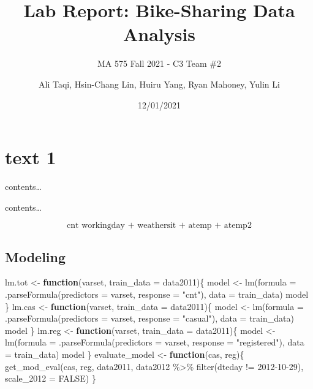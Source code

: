 \documentclass[
  twocolumn]{article}
\title{Lab Report: Bike-Sharing Data Analysis}
\subtitle{MA 575 Fall 2021 - C3 Team \#2}
\author{Ali Taqi, Hsin-Chang Lin, Huiru Yang, Ryan Mahoney, Yulin Li}
\date{12/01/2021}
\newenvironment{Shaded}{\begin{snugshade}}{\end{snugshade}}
\newcommand{\AttributeTok}[1]{\textcolor[rgb]{0.77,0.63,0.00}{#1}}
\newcommand{\ConstantTok}[1]{\textcolor[rgb]{0.00,0.00,0.00}{#1}}
\newcommand{\ControlFlowTok}[1]{\textcolor[rgb]{0.13,0.29,0.53}{\textbf{#1}}}
\newcommand{\FunctionTok}[1]{\textcolor[rgb]{0.00,0.00,0.00}{#1}}
\newcommand{\NormalTok}[1]{#1}
\newcommand{\OtherTok}[1]{\textcolor[rgb]{0.56,0.35,0.01}{#1}}
\newcommand{\SpecialCharTok}[1]{\textcolor[rgb]{0.00,0.00,0.00}{#1}}
\newcommand{\StringTok}[1]{\textcolor[rgb]{0.31,0.60,0.02}{#1}}
\begin{document}
\maketitle

\twocolumn

\hypertarget{text-1}{%
\section{text 1}\label{text-1}}

contents\ldots{}

contents\ldots{}

\[\text{cnt \~ workingday + weathersit + atemp + atemp\^2}\]

\hypertarget{modeling}{%
\subsection{Modeling}\label{modeling}}

\begin{Shaded}
\begin{Highlighting}[]
\NormalTok{lm.tot }\OtherTok{\textless{}{-}} \ControlFlowTok{function}\NormalTok{(varset, }\AttributeTok{train\_data =}\NormalTok{ data2011)\{}
\NormalTok{  model }\OtherTok{\textless{}{-}} \FunctionTok{lm}\NormalTok{(}\AttributeTok{formula =} \FunctionTok{.parseFormula}\NormalTok{(}\AttributeTok{predictors =}\NormalTok{ varset, }\AttributeTok{response =} \StringTok{"cnt"}\NormalTok{), }\AttributeTok{data =}\NormalTok{ train\_data)}
\NormalTok{  model}
\NormalTok{\}}
\NormalTok{lm.cas }\OtherTok{\textless{}{-}} \ControlFlowTok{function}\NormalTok{(varset, }\AttributeTok{train\_data =}\NormalTok{ data2011)\{}
\NormalTok{  model }\OtherTok{\textless{}{-}} \FunctionTok{lm}\NormalTok{(}\AttributeTok{formula =} \FunctionTok{.parseFormula}\NormalTok{(}\AttributeTok{predictors =}\NormalTok{ varset, }\AttributeTok{response =} \StringTok{"casual"}\NormalTok{), }\AttributeTok{data =}\NormalTok{ train\_data)}
\NormalTok{  model}
\NormalTok{\}}
\NormalTok{lm.reg }\OtherTok{\textless{}{-}} \ControlFlowTok{function}\NormalTok{(varset, }\AttributeTok{train\_data =}\NormalTok{ data2011)\{}
\NormalTok{  model }\OtherTok{\textless{}{-}} \FunctionTok{lm}\NormalTok{(}\AttributeTok{formula =} \FunctionTok{.parseFormula}\NormalTok{(}\AttributeTok{predictors =}\NormalTok{ varset, }\AttributeTok{response =} \StringTok{"registered"}\NormalTok{), }\AttributeTok{data =}\NormalTok{ train\_data)}
\NormalTok{  model}
\NormalTok{\}}
\NormalTok{evaluate\_model }\OtherTok{\textless{}{-}} \ControlFlowTok{function}\NormalTok{(cas, reg)\{}
  \FunctionTok{get\_mod\_eval}\NormalTok{(cas, reg, data2011, data2012 }\SpecialCharTok{\%\textgreater{}\%} \FunctionTok{filter}\NormalTok{(dteday }\SpecialCharTok{!=} \StringTok{\textquotesingle{}2012{-}10{-}29\textquotesingle{}}\NormalTok{), }\AttributeTok{scale\_2012 =} \ConstantTok{FALSE}\NormalTok{)}
\NormalTok{\}}
\end{Highlighting}
\end{Shaded}
\end{document}

